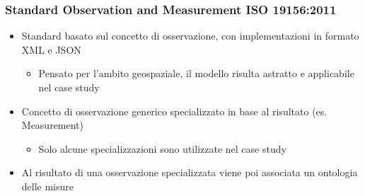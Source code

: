 \documentclass{beamer}
\begin{document}






\begin{frame}
\frametitle{Standard Observation and Measurement ISO 19156:2011}
\begin{itemize}
\item Standard basato sul concetto di osservazione, con implementazioni in formato XML e JSON
\begin{itemize}
\item Pensato per l'ambito geospaziale, il modello risulta astratto e applicabile nel case study
\end{itemize}
\item Concetto di osservazione generico specializzato in base al risultato (es. Measurement)
\begin{itemize}
\item Solo alcune specializzazioni sono utilizzate nel case study
\end{itemize}
\item Al risultato di una osservazione specializzata viene poi associata un ontologia delle misure
\end{itemize}	
\end{frame}

\end{document}
